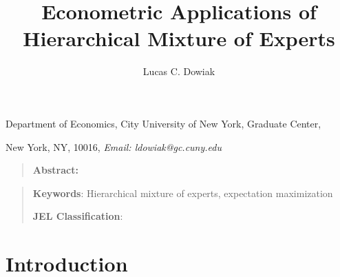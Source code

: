 \documentclass[12pt]{article}
\title{Econometric Applications of Hierarchical Mixture of Experts}
\author{Lucas C. Dowiak}
\begin{document}
 
\maketitle{}


Department of Economics, City University of New York\smallskip, Graduate
Center,

New York, NY, 10016, \textit{Email: ldowiak@gc.cuny.edu}

\qquad

\begin{quotation}
\textbf{Abstract:}
\end{quotation}

\vspace{1pt}

\begin{quotation}
\textbf{Keywords}: Hierarchical mixture of experts, expectation maximization

\textbf{JEL Classification}: 
\end{quotation}

\vspace{1pt}

\section{Introduction}
\end{document}
